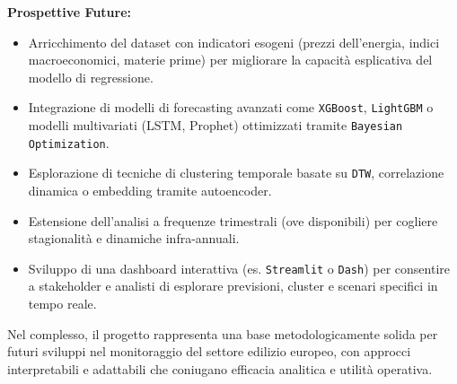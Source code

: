 \documentclass[conference]{IEEEtran}
\begin{document}
\newpage
\vspace{0.5em}
\noindent\textbf{Prospettive Future:}
\begin{itemize}
  \item Arricchimento del dataset con indicatori esogeni (prezzi dell'energia, indici macroeconomici, materie prime) per migliorare la capacità esplicativa del modello di regressione.
  \item Integrazione di modelli di forecasting avanzati come \texttt{XGBoost}, \texttt{LightGBM} o modelli multivariati (LSTM, Prophet) ottimizzati tramite \texttt{Bayesian Optimization}.
  \item Esplorazione di tecniche di clustering temporale basate su \texttt{DTW}, correlazione dinamica o embedding tramite autoencoder.
  \item Estensione dell’analisi a frequenze trimestrali (ove disponibili) per cogliere stagionalità e dinamiche infra-annuali.
  \item Sviluppo di una dashboard interattiva (es. \texttt{Streamlit} o \texttt{Dash}) per consentire a stakeholder e analisti di esplorare previsioni, cluster e scenari specifici in tempo reale.
\end{itemize}

Nel complesso, il progetto rappresenta una base metodologicamente solida per futuri sviluppi nel monitoraggio del settore edilizio europeo, con approcci interpretabili e adattabili che coniugano efficacia analitica e utilità operativa.
\end{document}
